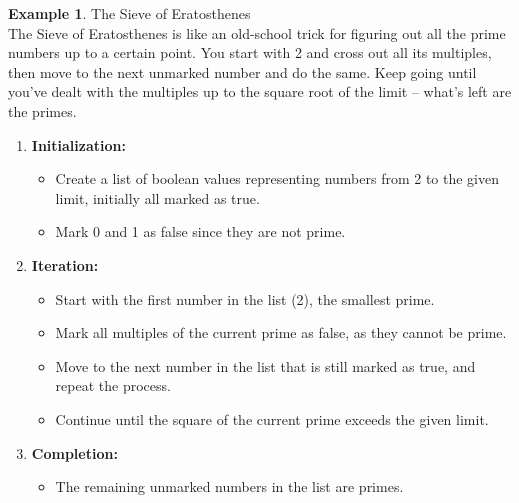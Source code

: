 \documentclass[letterpaper,10pt]{article}
\theoremstyle{plain}
\theoremstyle{definition}
\newtheorem{exmp}[thm]{Example}
\theoremstyle{remark}
\begin{document}
\begin{exmp}{The Sieve of Eratosthenes}$ $\\

The Sieve of Eratosthenes is like an old-school trick for figuring out all the prime numbers up to a certain point. You start with 2 and cross out all its multiples, then move to the next unmarked number and do the same. Keep going until you've dealt with the multiples up to the square root of the limit – what's left are the primes.
\begin{enumerate}
  \item \textbf{Initialization:}
    \begin{itemize}
      \item Create a list of boolean values representing numbers from 2 to the given limit, initially all marked as true.
      \item Mark 0 and 1 as false since they are not prime.
    \end{itemize}
  
  \item \textbf{Iteration:}
    \begin{itemize}
      \item Start with the first number in the list (2), the smallest prime.
      \item Mark all multiples of the current prime as false, as they cannot be prime.
      \item Move to the next number in the list that is still marked as true, and repeat the process.
      \item Continue until the square of the current prime exceeds the given limit.
    \end{itemize}
  
  \item \textbf{Completion:}
    \begin{itemize}
      \item The remaining unmarked numbers in the list are primes.
    \end{itemize}
  

\end{enumerate}
\end{exmp}
\end{document}
